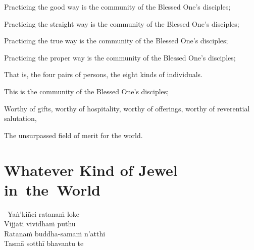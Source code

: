 \begin{english-verses}
  \begin{english-hang-first-line}
    Practicing the good way is the community of the Blessed One's disciples;
  \end{english-hang-first-line}
  \begin{english-hang-together-verses}
    Practicing the straight way is the community of the Blessed One's disciples;
  \end{english-hang-together-verses}
  \begin{english-hang-together-verses}
    Practicing the true way is the community of the Blessed One's disciples;
  \end{english-hang-together-verses}
  \begin{english-hang-together-verses}
    Practicing the proper way is the community of the Blessed One's disciples;
  \end{english-hang-together-verses}
  \begin{english-hang-together-verses}
    That is, the four pairs of persons, the eight kinds of individuals.
  \end{english-hang-together-verses}
  \begin{english-hang-together-verses}
    This is the community of the Blessed One's disciples;
  \end{english-hang-together-verses}
  \begin{english-hang-together-verses}
    Worthy of gifts, worthy of hospitality, worthy of offerings, worthy of reverential salutation,
  \end{english-hang-together-verses}
  \begin{english-hang-together-verses}
    The unsurpassed field of merit for the world.
  \end{english-hang-together-verses}
\end{english-verses}

\suttaRef{[SN 11.3]}



\section{Whatever Kind of Jewel \mbox{in}~the~World}
\label{whatever-kind-of-jewel}

\begin{pali-hang-together}
  \anglebracketleft\ \hspace{-0.5mm}Yaṅ'kiñci ratanaṁ loke \hspace{-0.5mm}\anglebracketright\ \\
  Vijjati vividhaṁ puthu\\
  Ratanaṁ buddha-samaṁ n'atthi\\
  Tasmā sotthī bhavantu te
\end{pali-hang-together}

